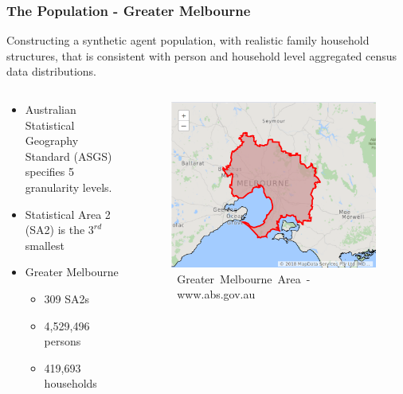 
\begin{frame} \frametitle{The Population - Greater Melbourne}%
  \vfill %
  Constructing a synthetic agent population, with realistic family household
  structures, that is consistent with person and household level aggregated
  census data distributions.
  
  
  \begin{columns}[T] %
    \begin{column}{.49\textwidth} \begin{itemize} \item Australian Statistical
        Geography Standard (ASGS) specifies 5 granularity levels. \item 
        Statistical
        Area 2 (SA2) is the  $3^{rd}$ smallest \item Greater Melbourne
        \begin{itemize} \item 309 SA2s \item 4,529,496 persons \item 419,693
          households \end{itemize} \end{itemize} \end{column}%
    \hfill%
    \begin{column}{.49\textwidth} \begin{figure} \includegraphics[trim={5cm
          3.5cm 0 3.5cm},clip,scale=0.35] {images/abs-grt-melb} \newline 
          \mbox{\small
          Greater Melbourne Area - www.abs.gov.au} \end{figure} \end{column}%
  \end{columns}%
\end{frame}
  
